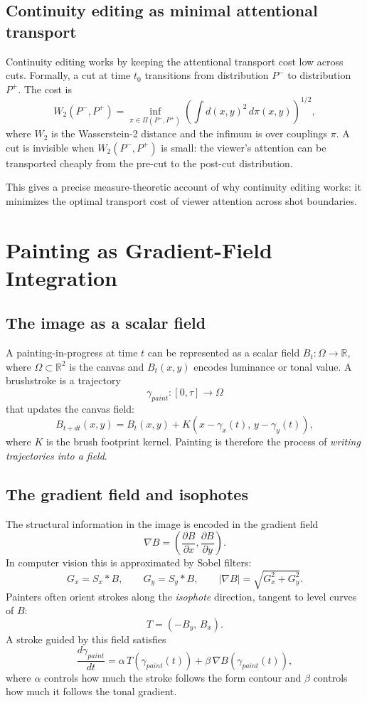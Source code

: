 \documentclass[12pt,a4paper]{article}
\theoremstyle{plain}
\theoremstyle{definition}
\begin{document}
\subsection{Continuity editing as minimal attentional transport}

Continuity editing works by keeping the attentional transport cost low across
cuts. Formally, a cut at time $t_0$ transitions from distribution $P^-$ to
distribution $P^+$. The cost is
\[
W_2(P^-, P^+) = \inf_{\pi \in \Pi(P^-,P^+)}
\left(\int d(x,y)^2\,d\pi(x,y)\right)^{1/2},
\]
where $W_2$ is the Wasserstein-2 distance and the infimum is over couplings
$\pi$. A cut is invisible when $W_2(P^-,P^+)$ is small: the viewer's attention
can be transported cheaply from the pre-cut to the post-cut distribution.

This gives a precise measure-theoretic account of why continuity editing
works: it minimizes the optimal transport cost of viewer attention across
shot boundaries.

\section{Painting as Gradient-Field Integration}
\label{sec:painting}

\subsection{The image as a scalar field}

A painting-in-progress at time $t$ can be represented as a scalar field
$B_t:\Omega\to\mathbb{R}$, where $\Omega\subset\mathbb{R}^2$ is the canvas and
$B_t(x,y)$ encodes luminance or tonal value. A brushstroke is a trajectory
\[
\gamma_{paint}:[0,\tau]\to\Omega
\]
that updates the canvas field:
\[
B_{t+dt}(x,y) = B_t(x,y) + K(x-\gamma_x(t),\,y-\gamma_y(t)),
\]
where $K$ is the brush footprint kernel. Painting is therefore the process of
\emph{writing trajectories into a field}.

\subsection{The gradient field and isophotes}

The structural information in the image is encoded in the gradient field
\[
\nabla B = \left(\frac{\partial B}{\partial x},\frac{\partial B}{\partial y}\right).
\]
In computer vision this is approximated by Sobel filters:
\[
G_x = S_x * B,\qquad G_y = S_y * B,\qquad |\nabla B| = \sqrt{G_x^2+G_y^2}.
\]
Painters often orient strokes along the \emph{isophote} direction, tangent to
level curves of $B$:
\[
T = (-B_y,\, B_x).
\]
A stroke guided by this field satisfies
\[
\frac{d\gamma_{paint}}{dt} = \alpha\,T(\gamma_{paint}(t)) + \beta\,\nabla B(\gamma_{paint}(t)),
\]
where $\alpha$ controls how much the stroke follows the form contour and $\beta$
controls how much it follows the tonal gradient.
\end{document}
